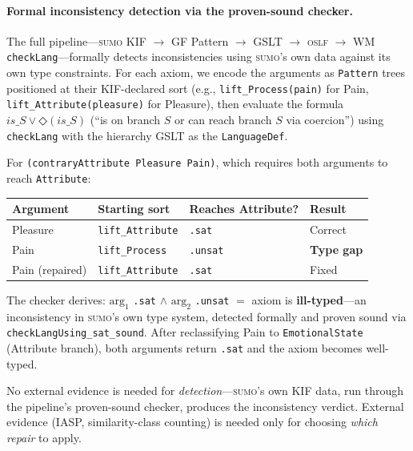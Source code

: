 \documentclass[11pt]{article}
\newcommand{\DiamondOp}{\mathbin{\Diamond}}
\newcommand{\SUMO}{\textsc{sumo}}
\newcommand{\OSLF}{\textsc{oslf}}
\theoremstyle{definition}
\theoremstyle{plain}
\begin{document}
\paragraph{Formal inconsistency detection via the proven-sound checker.}
The full pipeline---\SUMO{} KIF $\to$ GF Pattern $\to$ GSLT $\to$
\OSLF{} $\to$ WM \texttt{checkLang}---formally detects inconsistencies
using \SUMO{}'s own data against its own type constraints.  For each
axiom, we encode the arguments as \texttt{Pattern} trees positioned
at their KIF-declared sort (e.g., \texttt{lift\_Process(pain)} for Pain,
\texttt{lift\_Attribute(pleasure)} for Pleasure), then evaluate the
formula $\mathit{is\_S} \lor \DiamondOp(\mathit{is\_S})$ (``is on
branch $S$ or can reach branch $S$ via coercion'') using
\texttt{checkLang} with the hierarchy GSLT as the \texttt{LanguageDef}.

For \texttt{(contraryAttribute Pleasure Pain)}, which requires both
arguments to reach \texttt{Attribute}:
\begin{center}\small
\begin{tabular}{@{}llll@{}}
\toprule
\textbf{Argument} & \textbf{Starting sort} & \textbf{Reaches Attribute?}
  & \textbf{Result} \\
\midrule
Pleasure & \texttt{lift\_Attribute} & \texttt{.sat}
  & Correct \\
Pain & \texttt{lift\_Process} & \texttt{.unsat}
  & \textbf{Type gap} \\
Pain (repaired) & \texttt{lift\_Attribute} & \texttt{.sat}
  & Fixed \\
\bottomrule
\end{tabular}
\end{center}
The checker derives: $\text{arg}_1$ \texttt{.sat} $\land$ $\text{arg}_2$
\texttt{.unsat} $=$ axiom is \textbf{ill-typed}---an inconsistency
in \SUMO{}'s own type system, detected formally and proven sound via
\texttt{checkLangUsing\_sat\_sound}.  After reclassifying Pain to
\texttt{EmotionalState} (Attribute branch), both arguments return
\texttt{.sat} and the axiom becomes well-typed.

No external evidence is needed for \emph{detection}---\SUMO{}'s own
KIF data, run through the pipeline's proven-sound checker, produces
the inconsistency verdict.  External evidence (IASP, similarity-class
counting) is needed only for choosing \emph{which repair} to apply.
\end{document}
